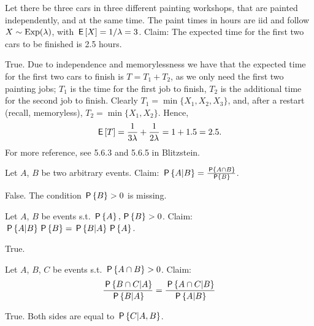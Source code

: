 \documentclass[tf-tutorial-all.tex]{subfiles}
\begin{document}
\begin{truefalse}
Let there be three cars in three different painting workshops, that are painted independently, and at the same time. The paint times in hours are iid and follow $X\sim \Exp{\lambda}$, with $\E X = 1/ \lambda = 3$.
Claim: The expected time for the first two cars to be finished is 2.5 hours.

\begin{solution}
True.
Due to independence and memorylessness we have that the expected time for the first two cars to finish is $ T = T_{1} + T_{2}$, as we only need the first two painting jobs;
$T_{1}$ is the time for the first job to finish, $T_{2}$ is the additional time for the second job to finish.
Clearly $T_{1} = \min\{X_{1}, X_{2}, X_{3}\}$,  and, after a restart (recall, memoryless), $T_{2} = \min\{X_{1}, X_{2}\}$. Hence,
\begin{equation*}
\E T = \frac{1}{3 \lambda} + \frac{1}{2\lambda} = 1 + 1.5 = 2.5.
\end{equation*}
For more reference, see 5.6.3 and 5.6.5 in Blitzstein.
\end{solution}
\end{truefalse}



\begin{truefalse}
Let $A$, $B$ be two arbitrary events. Claim: $\P{A|B}=\frac{\P{A \cap B}}{\P{B}}$.
\begin{solution}
False. The condition $\P{B}>0$ is missing.
\end{solution}
\end{truefalse}





\begin{truefalse}
Let $A$, $B$ be events s.t. $\P{A},\P{B}>0$. Claim: $\P{A|B}\P{B}=\P{B|A}\P{A}$.
\begin{solution}
True.
\end{solution}
\end{truefalse}



\begin{truefalse}
Let $A$, $B$, $C$ be events s.t. $\P{A \cap B}>0$. Claim:
\begin{equation}
\frac{\P{B \cap C | A}}{\P{B|A}}=\frac{\P{A \cap C|B}}{\P{A|B}}
\end{equation}
\begin{solution}
True. Both sides are equal to $\P{C|A,B}$.
\end{solution}
\end{truefalse}
\end{document}

